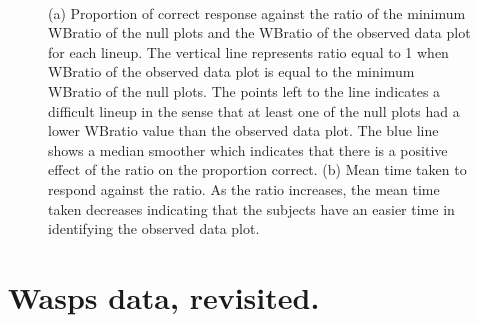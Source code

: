 \begin{figure}[htbp]
\centering
\mbox{\quad
{}}
\caption{(a) Proportion of correct response against the ratio of the minimum WBratio of the null plots and the WBratio of the observed data plot for each lineup. The vertical line represents ratio equal to 1 when WBratio of the observed data plot is equal to the minimum WBratio of the null plots. The points left to the line indicates a difficult lineup in the sense that at least one of the null plots had a lower WBratio value than the observed data plot. The blue line shows a median smoother which indicates that there is a positive effect of the ratio on the proportion correct. (b) Mean time taken to respond against the ratio. As the ratio increases, the mean time taken decreases indicating that the subjects have an easier time in identifying the observed data plot. } 
\label{null}
\end{figure}




\section{Wasps data, revisited. }

